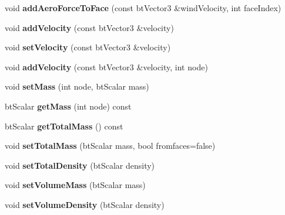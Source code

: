 \begin{DoxyCompactItemize}
\item 
\mbox{\label{classbtSoftBody_a7334858e70ed00edaa3880afabbf5bff}} 
void {\bfseries add\+Aero\+Force\+To\+Face} (const bt\+Vector3 \&wind\+Velocity, int face\+Index)
\item 
\mbox{\label{classbtSoftBody_a3407addc1014cef6327ed009f4804da7}} 
void {\bfseries add\+Velocity} (const bt\+Vector3 \&velocity)
\item 
\mbox{\label{classbtSoftBody_a94daa5306dfad2e4c5b29715600aed8e}} 
void {\bfseries set\+Velocity} (const bt\+Vector3 \&velocity)
\item 
\mbox{\label{classbtSoftBody_a5befe4cdedc0cf4d002471fd25f59416}} 
void {\bfseries add\+Velocity} (const bt\+Vector3 \&velocity, int node)
\item 
\mbox{\label{classbtSoftBody_a1aa16f724cd3f5e8431f3fec07d75b60}} 
void {\bfseries set\+Mass} (int node, bt\+Scalar mass)
\item 
\mbox{\label{classbtSoftBody_a7d46a1f40127715d1a7e0bb9b41bac1a}} 
bt\+Scalar {\bfseries get\+Mass} (int node) const
\item 
\mbox{\label{classbtSoftBody_ad065e0d97e7ba678fc40bf7668ec751f}} 
bt\+Scalar {\bfseries get\+Total\+Mass} () const
\item 
\mbox{\label{classbtSoftBody_ad7fa51cdee5753af58c3d7cf5c15330f}} 
void {\bfseries set\+Total\+Mass} (bt\+Scalar mass, bool fromfaces=false)
\item 
\mbox{\label{classbtSoftBody_a6018d917b0eee5dc61c4d5cc66a6ceb2}} 
void {\bfseries set\+Total\+Density} (bt\+Scalar density)
\item 
\mbox{\label{classbtSoftBody_a65a3db52b7fe9c869cb85577d292833d}} 
void {\bfseries set\+Volume\+Mass} (bt\+Scalar mass)
\item 
\mbox{\label{classbtSoftBody_a79bfb08e24aa77bdd08db4ee7853b544}} 
void {\bfseries set\+Volume\+Density} (bt\+Scalar density)

\end{DoxyCompactItemize}
